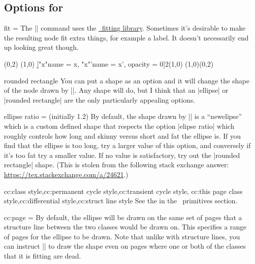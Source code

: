 \begin{sseqdata}[name = basic, cohomological Serre grading]
\subsection{Options for \sectionstring\circleclass}
\begin{key}{fit = }%
The |\circleclasses| command uses the \href{\pgfmanualurl#section.52}{\tikzpkg\
fitting library}. Sometimes it's desirable to make the resulting node fit extra
things, for example a label. It doesn't necessarily end up looking great though.
\begin{codeexample}[]
\begin{sseqpage}[ Adams grading, axes gap = 0.7cm ]
\class(0,2)
\class(1,0)
\d["x"{name = x}, "x"'{name = x', opacity = 0}]2(1,0)
\circleclasses[fit = (x)(x'), rounded rectangle](1,0)(0,2)
\end{sseqpage}
\end{codeexample}
\end{key}

\begin{key}{rounded rectangle}
You can put a shape as an option and it will change the shape of the node drawn
by |\circleclasses|. Any shape will do, but I think that an |ellipse| or
|rounded rectangle| are the only particularly appealing options.
\end{key}

\begin{key}{ellipse ratio =  (initially 1.2)}%
By default, the shape drawn by |\circleclasses| is a ``newelipse'' which is a
custom defined shape that respects the option |elipse ratio| which roughly
controls how long and skinny versus short and fat the ellipse is. If you find
that the ellipse is too long, try a larger value of this option, and conversely
if it's too fat try a smaller value. If no value is satisfactory, try out the
|rounded rectangle| shape. (This is stolen from the following stack exchange
answer: \url{https://tex.stackexchange.com/a/24621}.)
\end{key}

\begin{keylist}{
    cc:class style,cc:permanent cycle style,cc:transient cycle style,
    cc:this page class style,cc:differential style,cc:struct line style
}
See the \pgfmanualpdfref{class style}{corresponding entry} in the \tikzpkg\
primitives section.
\end{keylist}

\begin{key}{cc:page = }%
By default, the ellipse will be drawn on the same set of pages that a structure
line between the two classes would be drawn on. This specifies a range of pages
for the ellipse to be drawn. Note that unlike with structure lines, you can
instruct |\circleclasses| to draw the shape even on pages where one or both of
the classes that it is fitting are dead.
\end{key}


\end{sseqdata}
